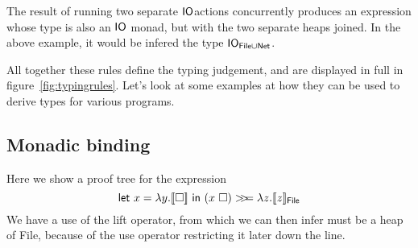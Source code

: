 The result of running two separate $\mathsf{IO}$actions concurrently produces
an expression whose type is also an $\mathsf{IO}$ monad, but with the two
separate heaps joined. In the above example, it would be infered the
type $\mathsf{IO}_{\textsf{File} \cup \textsf{Net}}$.

All together these rules define the typing judgement, and are
displayed in full in figure~\ref{fig:typingrules}. Let's look at some
examples at how they can be used to derive types for various
programs.

\subsection{Monadic binding}
Here we show a proof tree for the expression
$$\letin{x = \lambda y . \lift{\square}}{(x \ \square) \bind \lambda z . \llbracket z
  \rrbracket_{\textsf{File}}}$$
We have a use of the lift operator, from which we can then infer
must be a heap of \textsf{File}, because of the use operator
restricting it later down the line.
